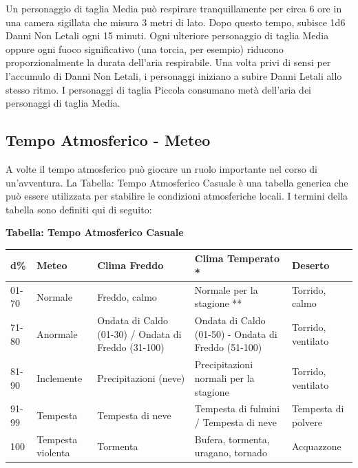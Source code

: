 \begin{multicols}{2}
Un personaggio di taglia Media può respirare tranquillamente per circa 6 ore in una camera sigillata che misura 3 metri di lato. Dopo questo tempo, subisce 1d6 Danni Non Letali ogni 15 minuti. Ogni ulteriore personaggio di taglia Media oppure ogni fuoco significativo (una torcia, per esempio) riducono proporzionalmente la durata dell'aria respirabile. Una volta privi di sensi per l'accumulo di Danni Non Letali, i personaggi iniziano a subire Danni Letali allo stesso ritmo. I personaggi di taglia Piccola consumano metà dell'aria dei personaggi di taglia Media.

\subsection{Tempo Atmosferico - Meteo}

\label{tempo-atmosferico---meteo}

A volte il tempo atmosferico può giocare un ruolo importante nel corso di un'avventura. La Tabella: Tempo Atmosferico Casuale è una tabella generica che può essere utilizzata per stabilire le condizioni atmosferiche locali. I termini della tabella sono definiti qui di seguito:

\end{multicols}

\medskip

\textbf{Tabella: Tempo Atmosferico Casuale}

\medskip

\noindent\begin{tabularx}{\linewidth}{llXXl}
	\toprule
\rowcolor{gray!20}\textbf{d\%} & \textbf{Meteo} & \textbf{Clima Freddo}& \textbf{Clima Temperato *} & \textbf{Deserto}\\
\toprule
01-70 & Normale& Freddo, calmo & Normale per la stagione ** & Torrido, calmo\\
\rowcolor{gray!20}71-80 & Anormale & Ondata di Caldo (01-30) / Ondata di Freddo (31-100)&Ondata di Caldo (01-50) - Ondata di Freddo (51-100)& Torrido, ventilato \\
81-90 & Inclemente & Precipitazioni (neve)& Precipitazioni normali per la stagione& Torrido, ventilato \\
\rowcolor{gray!20}91-99 & Tempesta & Tempesta di neve& Tempesta di fulmini / Tempesta di neve& Tempesta di polvere \\
100& Tempesta violenta& Tormenta & Bufera, tormenta, uragano, tornado & Acquazzone
\end{tabularx}

